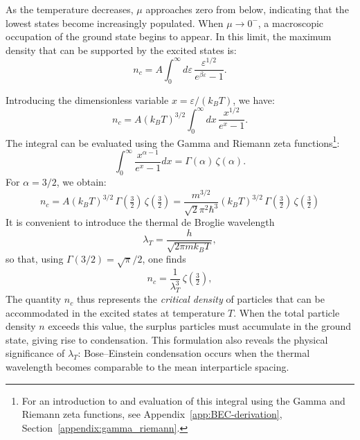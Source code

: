 As the temperature decreases, \( \mu \) approaches zero from below, indicating that the lowest states become increasingly populated.  
When \( \mu \to 0^- \), a macroscopic occupation of the ground state begins to appear.  
In this limit, the maximum density that can be supported by the excited states is:
\begin{equation}
    n_c = A \int_0^{\infty} d\varepsilon\, 
           \frac{\varepsilon^{1/2}}{e^{\beta \varepsilon} - 1}.
    \label{eq:nc_integral}
\end{equation}

Introducing the dimensionless variable \( x = \varepsilon / (k_B T) \), we have:
\begin{equation}
    n_c = A (k_B T)^{3/2} 
          \int_0^{\infty} dx\, \frac{x^{1/2}}{e^x - 1}.
\end{equation}
The integral can be evaluated using the Gamma and Riemann zeta functions\footnote{For an introduction to and evaluation of this integral using the Gamma and Riemann zeta functions, see Appendix~\ref{app:BEC-derivation}, Section~\ref{appendix:gamma_riemann}.}:
\[
    \int_0^{\infty} \frac{x^{\alpha - 1}}{e^x - 1} dx = \Gamma(\alpha)\, \zeta(\alpha).
\]
For \( \alpha = 3/2 \), we obtain:
\begin{equation}
\boxed{
    n_c  = 
            A (k_B T)^{3/2}
          \,\Gamma\!\left(\tfrac{3}{2}\right)
          \,\zeta\!\left(\tfrac{3}{2}\right) = 
          \frac{m^{3/2}}{\sqrt{2}\pi^2\hbar^3} (k_B T)^{3/2}
          \,\Gamma\!\left(\tfrac{3}{2}\right)
          \,\zeta\!\left(\tfrac{3}{2}\right)
        }
          \label{eq:nc_result}
\end{equation}
It is convenient to introduce the thermal de Broglie wavelength
\begin{equation}
    \lambda_T = \frac{h}{\sqrt{2\pi m k_B T}},
\end{equation}
so that, using $\Gamma(3/2) = \sqrt{\pi}/2$, one finds
\begin{equation}
    n_c = \frac{1}{\lambda_T^3}\,\zeta\!\left(\tfrac{3}{2}\right),
\end{equation}
The quantity \(n_c\) thus represents the \textit{critical density} of particles that can be accommodated in the excited states at temperature \(T\).  
When the total particle density \(n\) exceeds this value, the surplus particles must accumulate in the ground state, giving rise to condensation.  
This formulation also reveals the physical significance of \(\lambda_T\):  
Bose–Einstein condensation occurs when the thermal wavelength becomes comparable to the mean interparticle spacing.

